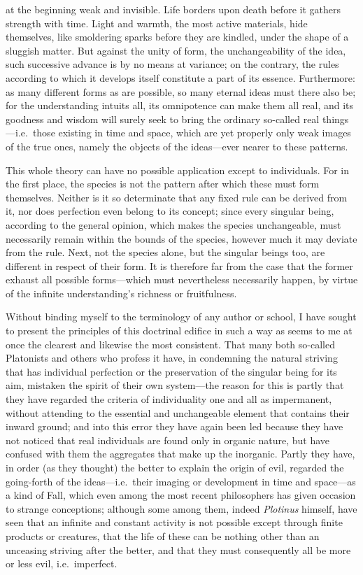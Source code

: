 \documentclass[12pt,a4paper]{article}
\begin{document}
at the beginning weak and invisible. Life borders upon death before
it gathers strength with time. Light and warmth, the most active materials, hide
themselves, like smoldering sparks before they are kindled, under the shape of a
sluggish matter. But against the unity of form, the unchangeability of the idea,
such successive advance is by no means at variance; on the contrary, the rules
according to which it develops itself constitute a part of its essence.
Furthermore: as many different forms as are possible, so many eternal ideas must
there also be; for the understanding intuits all, its omnipotence can make them
all real, and its goodness and wisdom will surely seek to bring the ordinary
so-called real things---i.e.\ those existing in time and space, which are yet
properly only weak images of the true ones, namely the objects of the
ideas---ever nearer to these patterns.

This whole theory can have no possible application except to individuals. For in
the first place, the species is not the pattern after which these must form
themselves. Neither is it so determinate that any fixed rule can be derived from
it, nor does perfection even belong to its concept; since every singular being,
according to the general opinion, which makes the species unchangeable, must
necessarily remain within the bounds of the species, however much it may deviate
from the rule. Next, not the species alone, but the singular beings too, are
different in respect of their form. It is therefore far from the case that the
former exhaust all possible forms---which must nevertheless necessarily happen,
by virtue of the infinite understanding's richness or fruitfulness.

Without binding myself to the terminology of any author or school, I have sought
to present the principles of this doctrinal edifice
in such a way as seems to me at once the clearest and likewise the most
consistent. That many both so-called Platonists and others who profess it have,
in condemning the natural striving that has individual perfection or the
preservation of the singular being for its aim, mistaken the spirit of their own
system---the reason for this is partly that they have regarded the criteria of
individuality one and all as impermanent, without attending to the essential and
unchangeable element that contains their inward ground; and into this error they
have again been led because they have not noticed that real individuals are found
only in organic nature, but have confused with them the aggregates that make up
the inorganic. Partly they have, in order (as they thought) the better to explain
the origin of evil, regarded the going-forth of the ideas---i.e.\ their imaging or
development in time and space---as a kind of Fall, which even among the most
recent philosophers has given occasion to strange conceptions; although some
among them, indeed \emph{Plotinus} himself, have seen that an infinite and
constant activity is not possible except through finite products or creatures,
that the life of these can be nothing other than an unceasing striving after the
better, and that they must consequently all be more or less evil, i.e.\
imperfect.
\end{document}

